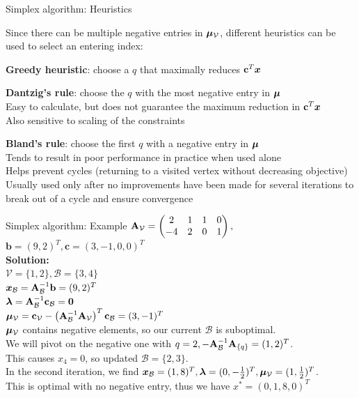 \documentclass[11pt,compress,t,notes=noshow, xcolor=table]{beamer}
\begin{document}
\begin{framei}[fs=small]{Simplex algorithm: Heuristics}
\item Since there can be multiple negative entries in $\bm{\mu}_{\mathcal{V}}$, different heuristics can be used to select an entering index:
\item \textbf{Greedy heuristic}: choose a $q$ that maximally reduces $\mathbf{c}^T \bm{x}$
\item \textbf{Dantzig's rule}: choose the $q$ with the most negative entry in $\bm{\mu}$\\
Easy to calculate, but does not guarantee the maximum reduction in $\mathbf{c}^T \bm{x}$\\
Also sensitive to scaling of the constraints
\item \textbf{Bland's rule}: choose the first $q$ with a negative entry in $\bm{\mu}$\\
Tends to result in poor performance in practice when used alone\\
Helps prevent cycles (returning to a visited vertex without decreasing objective)\\
Usually used only after no improvements have been made for several iterations to break out of a cycle and ensure convergence
\end{framei}


\begin{framev}[fs=small]{Simplex algorithm: Example}
$\mathbf{A}_{\mathcal{V}} =
\begin{pmatrix}
2 & 1 & 1 & 0 \\
-4 & 2 & 0 & 1
\end{pmatrix},$
$\mathbf{b} = (9, 2)^T, \mathbf{c} = (3, -1, 0, 0)^T$\\
\spacer
\textbf{Solution:}\\
$\mathcal{V}=\{1,2\}, \mathcal{B}=\{3, 4\}$\\
$\bm{x}_{\mathcal{B}} = \mathbf{A}_{\mathcal{B}}^{-1}\mathbf{b} = (9, 2)^T$\\
$\bm{\lambda} =  \mathbf{A}_{\mathcal{B}}^{-1}\mathbf{c}_{\mathcal{B}} = \mathbf{0}$\\
$\bm{\mu}_{\mathcal{V}} = \mathbf{c}_{\mathcal{V}} - \left( \mathbf{A}_{\mathcal{B}}^{-1} \mathbf{A}_{\mathcal{V}} \right)^T \mathbf{c}_{\mathcal{B}} = (3, -1)^T$\\
\spacer
$\bm{\mu}_{\mathcal{V}}$ contains negative elements, so our current $\mathcal{B}$ is suboptimal.\\
\spacer
We will pivot on the negative one with $q=2, - \mathbf{A}_{\mathcal{B}}^{-1} \mathbf{A}_{\{q\}}=(1,2)^T$.\\
This causes $x_4 = 0$, so updated $\mathcal{B}=\{2, 3\}$.\\
In the second iteration, we find $\bm{x}_{\mathcal{B}}=(1,8)^T, \bm{\lambda} = (0, -\frac{1}{2})^T, \bm{\mu}_{\mathcal{V}} = (1, \frac{1}{2})^T$.\\
\spacer
This is optimal with no negative entry, thus we have $x^*=(0,1,8,0)^T$
\end{framev}

\endlecture
\end{document}
